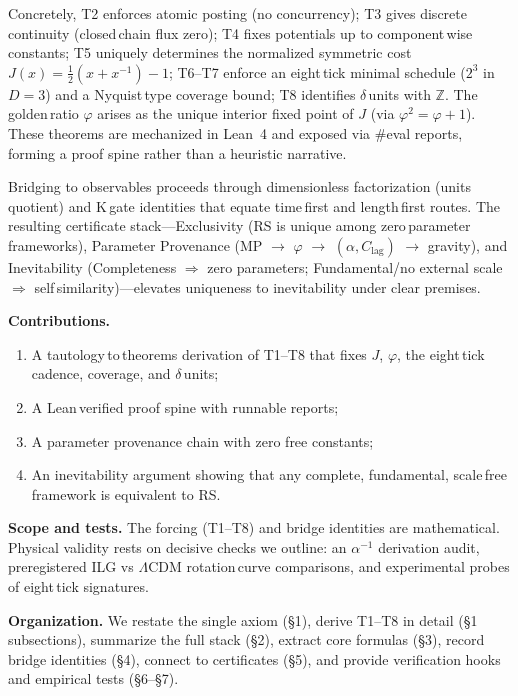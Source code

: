 \documentclass[11pt]{article}
\begin{document}
Concretely, T2 enforces atomic posting (no concurrency); T3 gives discrete continuity (closed\,chain flux zero); T4 fixes potentials up to component\,wise constants; T5 uniquely determines the normalized symmetric cost $J(x)=\tfrac12(x+x^{-1})-1$; T6–T7 enforce an eight\,tick minimal schedule ($2^3$ in $D{=}3$) and a Nyquist\,type coverage bound; T8 identifies $\delta$\,units with $\mathbb Z$. The golden\,ratio $\varphi$ arises as the unique interior fixed point of $J$ (via $\varphi^2=\varphi+1$). These theorems are mechanized in Lean~4 and exposed via \#eval reports, forming a proof spine rather than a heuristic narrative.

Bridging to observables proceeds through dimensionless factorization (units quotient) and K\,gate identities that equate time\,first and length\,first routes. The resulting certificate stack—Exclusivity (RS is unique among zero\,parameter frameworks), Parameter Provenance (MP $\to$ $\varphi$ $\to$ $(\alpha, C_{\!\mathrm{lag}})$ $\to$ gravity), and Inevitability (Completeness $\Rightarrow$ zero parameters; Fundamental/no external scale $\Rightarrow$ self\,similarity)—elevates uniqueness to inevitability under clear premises.

\noindent\textbf{Contributions.}
\begin{enumerate}[label=(\roman*), itemsep=2pt]
  \item A tautology\,to\,theorems derivation of T1–T8 that fixes $J$, $\varphi$, the eight\,tick cadence, coverage, and $\delta$\,units;
  \item A Lean\,verified proof spine with runnable reports;
  \item A parameter provenance chain with zero free constants;
  \item An inevitability argument showing that any complete, fundamental, scale\,free framework is equivalent to RS.
\end{enumerate}

\noindent\textbf{Scope and tests.} The forcing (T1–T8) and bridge identities are mathematical. Physical validity rests on decisive checks we outline: an $\alpha^{-1}$ derivation audit, preregistered ILG vs $\Lambda$CDM rotation\,curve comparisons, and experimental probes of eight\,tick signatures.

\noindent\textbf{Organization.} We restate the single axiom (\S1), derive T1–T8 in detail (\S1 subsections), summarize the full stack (\S2), extract core formulas (\S3), record bridge identities (\S4), connect to certificates (\S5), and provide verification hooks and empirical tests (\S6–\S7).
\end{document}

